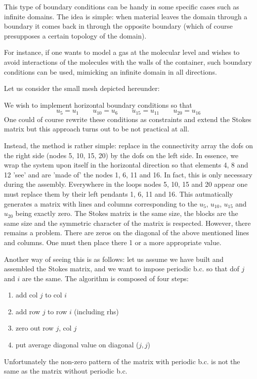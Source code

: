 
This type of boundary conditions can be handy in some specific cases such 
as infinite domains. The idea is simple: when material leaves the domain 
through a boundary it comes back in through the opposite boundary (which 
of course presupposes a certain topology of the domain). 

For instance, if one wants to model a gas at the molecular level and wishes 
to avoid interactions of the molecules with the walls of the container, 
such boundary conditions can be used, mimicking an infinite domain in all 
directions. 

Let us consider the small mesh depicted hereunder:


We wish to implement horizontal boundary conditions so that 
\[
u_5=u_1
\quad\quad
u_{10}=u_6
\quad\quad
u_{15}=u_{11}
\quad\quad
u_{20}=u_{16}
\]
One could of course rewrite these conditions as constraints and extend the Stokes 
matrix but this approach turns out to be not practical at all. 

Instead, the method is rather simple: replace in the connectivity array the dofs on the right side
(nodes 5, 10, 15, 20) by the dofs on the left side. In essence, we wrap the system upon itself 
in the horizontal direction so that elements 4, 8 and 12 'see' and are 'made of' the nodes 1, 6, 11 and 16.
In fact, this is only necessary during the assembly. Everywhere in the loops nodes 5, 10, 15 and 20 appear 
one must replace them by their left pendants 1, 6, 11 and 16. This autmatically generates a matrix 
with lines and columns corresponding to the $u_5$, $u_{10}$, $u_{15}$ and $u_{20}$ being exactly zero. 
The Stokes matrix is the same size, the blocks are the same size and the symmetric character of the matrix 
is respected. However, there remains a problem. There are zeros on the diagonal 
of the above mentioned lines and columns. One must then place there 1 or a more
appropriate value.

Another way of seeing this is as follows: let us assume we have built and assembled
the Stokes matrix, and we want to impose periodic b.c. so that dof $j$ and $i$ are the same. 
The algorithm is composed of four steps:
\begin{enumerate} 
\item add col $j$ to col $i$
\item add row $j$ to row $i$ (including rhs)
\item zero out row $j$, col $j$
\item put average diagonal value on diagonal ($j,j$)
\end{enumerate} 

\begin{remark}
Unfortunately the non-zero pattern of the matrix with periodic b.c. is not the same 
as the matrix without periodic b.c.
\end{remark}


